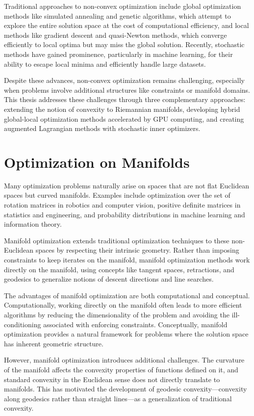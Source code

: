 Traditional approaches to non-convex optimization include global optimization methods like simulated annealing and genetic algorithms, which attempt to explore the entire solution space at the cost of computational efficiency, and local methods like gradient descent and quasi-Newton methods, which converge efficiently to local optima but may miss the global solution. Recently, stochastic methods have gained prominence, particularly in machine learning, for their ability to escape local minima and efficiently handle large datasets.

Despite these advances, non-convex optimization remains challenging, especially when problems involve additional structures like constraints or manifold domains. This thesis addresses these challenges through three complementary approaches: extending the notion of convexity to Riemannian manifolds, developing hybrid global-local optimization methods accelerated by GPU computing, and creating augmented Lagrangian methods with stochastic inner optimizers.

\section{Optimization on Manifolds}

Many optimization problems naturally arise on spaces that are not flat Euclidean spaces but curved manifolds. Examples include optimization over the set of rotation matrices in robotics and computer vision, positive definite matrices in statistics and engineering, and probability distributions in machine learning and information theory.

Manifold optimization extends traditional optimization techniques to these non-Euclidean spaces by respecting their intrinsic geometry. Rather than imposing constraints to keep iterates on the manifold, manifold optimization methods work directly on the manifold, using concepts like tangent spaces, retractions, and geodesics to generalize notions of descent directions and line searches.

The advantages of manifold optimization are both computational and conceptual. Computationally, working directly on the manifold often leads to more efficient algorithms by reducing the dimensionality of the problem and avoiding the ill-conditioning associated with enforcing constraints. Conceptually, manifold optimization provides a natural framework for problems where the solution space has inherent geometric structure.

However, manifold optimization introduces additional challenges. The curvature of the manifold affects the convexity properties of functions defined on it, and standard convexity in the Euclidean sense does not directly translate to manifolds. This has motivated the development of geodesic convexity—convexity along geodesics rather than straight lines—as a generalization of traditional convexity.

